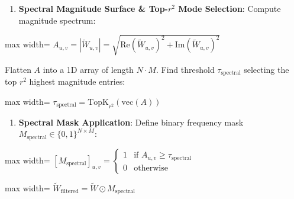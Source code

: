 \begin{enumerate}
\item \textbf{Spectral Magnitude Surface \& Top-$r^2$ Mode Selection}:
Compute magnitude spectrum:
\end{enumerate}
\begin{center}
\begin{adjustbox}{max width=\columnwidth}
$\displaystyle
A_{u, v} = \left| \widetilde{W}_{u, v} \right| = \sqrt{ \text{Re}\left(\widetilde{W}_{u, v}\right)^2 + \text{Im}\left(\widetilde{W}_{u, v}\right)^2 }
$
\end{adjustbox}
\end{center}
Flatten $A$ into a 1D array of length $N \cdot M$. Find threshold $\tau_{\text{spectral}}$ selecting the top $r^2$ highest magnitude entries:
\begin{center}
\begin{adjustbox}{max width=\columnwidth}
$\displaystyle
\tau_{\text{spectral}} = \text{TopK}_{r^2}\left( \text{vec}(A) \right)
$
\end{adjustbox}
\end{center}

\begin{enumerate}
\item \textbf{Spectral Mask Application}:
Define binary frequency mask $M_{\text{spectral}} \in \{0, 1\}^{N \times M}$:
\end{enumerate}
\begin{center}
\begin{adjustbox}{max width=\columnwidth}
$\displaystyle
[M_{\text{spectral}}]_{u, v} = \begin{cases} 1 & \text{if } A_{u, v} \ge \tau_{\text{spectral}} \\ 0 & \text{otherwise} \end{cases}
$
\end{adjustbox}
\end{center}
\begin{center}
\begin{adjustbox}{max width=\columnwidth}
$\displaystyle
\widetilde{W}_{\text{filtered}} = \widetilde{W} \odot M_{\text{spectral}}
$
\end{adjustbox}
\end{center}

